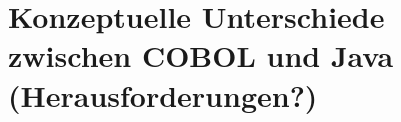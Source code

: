 \chapter{Konzeptuelle Unterschiede zwischen COBOL und Java (Herausforderungen?)}
\label{ch:herausforderungen}
    
    
    
    